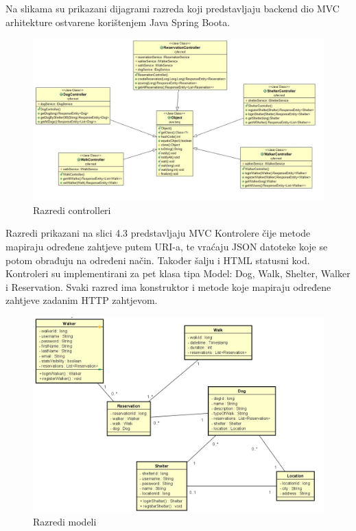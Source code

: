 			\fi
			
			
			Na slikama su prikazani dijagrami razreda koji predstavljaju backend dio MVC arhitekture ostvarene korištenjem Java Spring Boota.
			
			\vspace{15pt} 
			\begin{figure}[H]
				\includegraphics[scale=0.38]{dijagrami/controlleri.jpeg} %
				\centering
				\caption{Razredi controlleri}
				\label{fig:controlleri}
			\end{figure}
			
			
			Razredi prikazani na slici 4.3 predstavljaju MVC Kontrolere čije metode mapiraju određene zahtjeve putem URI-a, te vraćaju JSON datoteke koje se potom obrađuju na određeni način. Također šalju i HTML statusni kod.
			Kontroleri su implementirani za pet klasa tipa Model: Dog, Walk, Shelter, Walker i Reservation. Svaki razred ima konstruktor i metode koje mapiraju određene zahtjeve zadanim HTTP zahtjevom.
			
				\vspace{15pt} 
			\begin{figure}[H]
				\includegraphics[scale=0.4]{dijagrami/modeli.jpeg} %
				\centering
				\caption{Razredi modeli}
				\label{fig:modeli}
			\end{figure}
			
